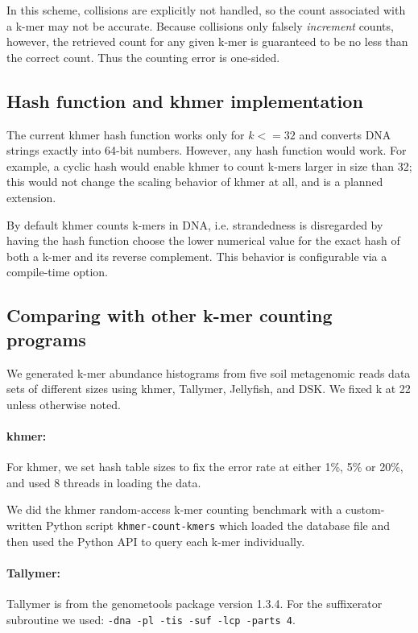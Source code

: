 \documentclass{article}
\begin{document}
In this scheme, collisions are explicitly not handled, so the count
associated with a k-mer may not be accurate. Because collisions only
falsely {\em increment} counts, however, the retrieved count for any
given k-mer is guaranteed to be no less than the correct count.  Thus
the counting error is one-sided.

\subsection{Hash function and khmer implementation}

The current khmer hash function works only for $k <= 32$ and converts
DNA strings exactly into 64-bit numbers.  However, any hash function
would work. For example, a cyclic hash would enable khmer to count
k-mers larger in size than 32; this would not change the scaling
behavior of khmer at all, and is a planned extension.

By default khmer counts k-mers in DNA, i.e. strandedness is
disregarded by having the hash function choose the lower numerical
value for the exact hash of both a k-mer and its reverse complement.
This behavior is configurable via a compile-time option.

\subsection{Comparing with other k-mer counting programs}

We generated k-mer abundance histograms from five soil metagenomic reads
data sets of different sizes using khmer, Tallymer, Jellyfish, and DSK.
We fixed k at 22 unless otherwise noted.

\paragraph{khmer:}
For khmer, we set hash table sizes to fix the error rate at
either 1\%, 5\% or 20\%, and used 8 threads in loading the data.

We did the khmer random-access k-mer counting benchmark with a
custom-written Python script {\tt khmer-count-kmers} which loaded the
database file and then used the Python API to query each k-mer
individually.

\paragraph{Tallymer:}
Tallymer is from the genometools package version 1.3.4. For the suffixerator subroutine we used:
{\tt -dna -pl -tis -suf -lcp -parts 4}.
\end{document}
